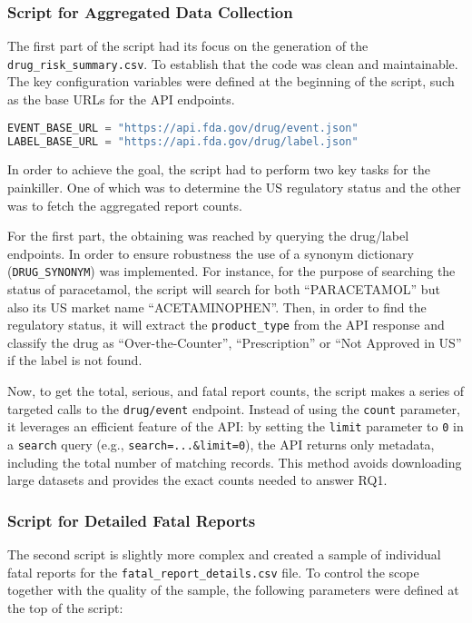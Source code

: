\subsubsection{Script for Aggregated Data Collection}
The first part of the script had its focus on the generation of the \texttt{drug\_risk\_summary.csv}. To establish that the code was clean and maintainable. The key configuration variables were defined at the beginning of the script, such as the base URLs for the API endpoints. 

\begin{lstlisting}[language=Python, caption={API base URLs defined in the script.}, label={lst:api_urls}, captionpos=b]
EVENT_BASE_URL = "https://api.fda.gov/drug/event.json"
LABEL_BASE_URL = "https://api.fda.gov/drug/label.json"
\end{lstlisting}

In order to achieve the goal, the script had to perform two key tasks for the painkiller. One of which was to determine the US regulatory status and the other was to fetch the aggregated report counts. 

For the first part, the obtaining was reached by querying the drug/label endpoints. In order to ensure robustness the use of a synonym dictionary (\texttt{DRUG\_SYNONYM}) was implemented. For instance, for the purpose of searching the status of paracetamol, the script will search for both “PARACETAMOL” but also its US market name “ACETAMINOPHEN”. Then, in order to find the regulatory status, it will extract the \texttt{product\_type} from the API response and classify the drug as “Over-the-Counter”, “Prescription” or “Not Approved in US” if the label is not found. 

Now, to get the total, serious, and fatal report counts, the script makes a series of targeted calls to the \texttt{drug/event} endpoint. Instead of using the \texttt{count} parameter, it leverages an efficient feature of the API: by setting the \texttt{limit} parameter to \texttt{0} in a \texttt{search} query (e.g., \texttt{search=...\&limit=0}), the API returns only metadata, including the total number of matching records. This method avoids downloading large datasets and provides the exact counts needed to answer RQ1.
\subsubsection{Script for Detailed Fatal Reports}
The second script is slightly more complex and created a sample of individual fatal reports for the \nolinkurl{fatal_report_details.csv} file. To control the scope together with the quality of the sample, the following parameters were defined at the top of the script:

